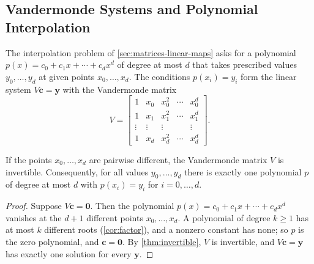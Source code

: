 \subsection{Vandermonde Systems and Polynomial Interpolation}

The interpolation problem of \cref{sec:matrices-linear-maps} asks for a polynomial $p(x)=c_0+c_1x+\cdots+c_dx^d$ of degree at most $d$ that takes prescribed values $y_0,\ldots,y_d$ at given points $x_0,\ldots,x_d$. The conditions $p(x_i)=y_i$ form the linear system $V\mathbf c=\mathbf y$ with the Vandermonde matrix
\[
V=\begin{bmatrix}1&x_0&x_0^2&\cdots&x_0^d\\1&x_1&x_1^2&\cdots&x_1^d\\\vdots&\vdots&\vdots&&\vdots\\1&x_d&x_d^2&\cdots&x_d^d\end{bmatrix}.
\]

\begin{theorem}
\label{thm:interpolation}
If the points $x_0,\ldots,x_d$ are pairwise different, the Vandermonde matrix $V$ is invertible. Consequently, for all values $y_0,\ldots,y_d$ there is exactly one polynomial $p$ of degree at most $d$ with $p(x_i)=y_i$ for $i=0,\ldots,d$.
\end{theorem}

\begin{proof}
Suppose $V\mathbf c=\mathbf 0$. Then the polynomial $p(x)=c_0+c_1x+\cdots+c_dx^d$ vanishes at the $d+1$ different points $x_0,\ldots,x_d$. A polynomial of degree $k\ge1$ has at most $k$ different roots (\cref{cor:factor}), and a nonzero constant has none; so $p$ is the zero polynomial, and $\mathbf c=\mathbf 0$. By \cref{thm:invertible}, $V$ is invertible, and $V\mathbf c=\mathbf y$ has exactly one solution for every $\mathbf y$.
\end{proof}

